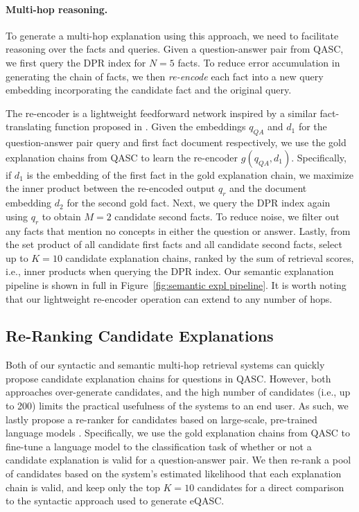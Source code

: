 \documentclass[letterpaper]{article} %
\begin{document}
\paragraph{Multi-hop reasoning.}
To generate a multi-hop explanation using this approach, we need to facilitate reasoning over the facts and queries. Given a question-answer pair from QASC, we first query the DPR index for {$N=5$} facts. To reduce error accumulation in generating the chain of facts, we then \textit{re-encode} each fact into a new query embedding incorporating the candidate fact and the original query. 

The re-encoder is a lightweight feedforward network inspired by a similar fact-translating function proposed in \citet{lin-etal-2021-differentiable}. Given the embeddings $q_{QA}$ and $d_1$ for the question-answer pair query and first fact document respectively, we use the gold explanation chains from QASC to learn the re-encoder $g(q_{QA}, d_1)$. Specifically, if $d_1$ is the embedding of the first fact in the gold explanation chain, we maximize the inner product between the re-encoded output $q_{r}$ and the document embedding $d_2$ for the second gold fact. Next, we query the DPR index again using $q_r$ to obtain {$M=2$} candidate second facts. To reduce noise, we filter out any facts that mention no concepts in either the question or answer.
Lastly, from the set product of all candidate first facts and all candidate second facts, select up to $K=10$ candidate explanation chains, ranked by the sum of retrieval scores, i.e., inner products when querying the DPR index. Our semantic explanation pipeline is shown in full in Figure~\ref{fig:semantic expl pipeline}. It is worth noting that our lightweight re-encoder operation can extend to any number of hops.

\subsection{Re-Ranking Candidate Explanations}
Both of our syntactic and semantic multi-hop retrieval systems can quickly propose candidate explanation chains for questions in QASC. However, both approaches over-generate candidates, and the high number of candidates (i.e., up to 200) limits the practical usefulness of the systems to an end user. As such, we lastly propose a re-ranker for candidates based on large-scale, pre-trained language models \cite{devlin-etal-2019-bert,liu2019roberta}. Specifically, we use the gold explanation chains from QASC to fine-tune a language model to the classification task of whether or not a candidate explanation is valid for a question-answer pair. We then re-rank a pool of candidates based on the system's estimated likelihood that each explanation chain is valid, and keep only the top $K=10$ candidates for a direct comparison to the syntactic approach used to generate eQASC.
\end{document}
